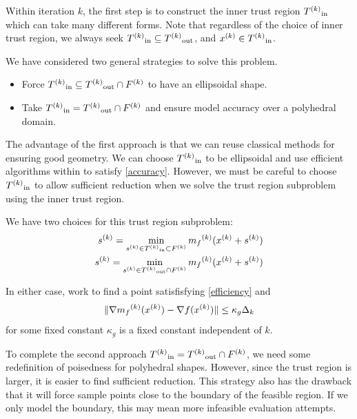 Within iteration $k$, the first step is to construct the inner trust region ${T^{(k)}}_{\text{in}}$ which can take many different forms.
Note that regardless of the choice of inner trust region, we always seek
${T^{(k)}}_{\text{in}} \subseteq {T^{(k)}}_{\text{out}} $, and ${x}^{(k)} \in {T^{(k)}}_{\text{in}}$.


We have considered two general strategies to solve this problem.

\begin{itemize}
\item Force $\label{bluepill} {T^{(k)}}_{\text{in}} \subseteq {T^{(k)}}_{\text{out}} \cap {F}^{(k)}$ to have an ellipsoidal shape.
\item Take $\label{redpill} {T^{(k)}}_{\text{in}} = {T^{(k)}}_{\text{out}} \cap {F}^{(k)}$ and ensure model accuracy over a polyhedral domain.
\end{itemize}

The advantage of the first approach is that we can reuse classical methods for ensuring good geometry.
We can choose ${T^{(k)}}_{\text{in}}$ to be ellipsoidal and use efficient algorithms within \cite{DUMMY:intro_book} to satisfy \ref{accuracy}.
However, we must be careful to choose ${T^{(k)}}_{\text{in}}$ to allow sufficient reduction when we solve the trust region subproblem using the inner trust region.


We have two choices for this trust region subproblem:
\label{which_trust_region}
\begin{align}
{s}^{(k)} = \min_{{s}^{(k)} \in {T^{(k)}}_{\text{in}} \subset {F}^{(k)}} {{m}_f}^{(k)}({x}^{(k)} + {s}^{(k)}) \label{search_a_little} \\
{s}^{(k)} = \min_{{s}^{(k)} \in {T^{(k)}}_{\text{out}} \cap {F}^{(k)}} {{m}_f}^{(k)}({x}^{(k)} + {s}^{(k)}) \label{search_a_lot}
\end{align}

In either case, work to find a point satisfisfying \ref{efficiency} and 
\begin{equation}
\label{accuracy}
\|\nabla {{m}_f}^{(k)}({x}^{(k)}) - \nabla f({x}^{(k)}) \| \le \kappa_g \Delta_k
\end{equation}
 for some fixed constant $\kappa_g$ is a fixed constant independent of $k$.

 

To complete the second approach ${T^{(k)}}_{\text{in}} = {T^{(k)}}_{\text{out}} \cap {F}^{(k)}$, we need some redefinition of poisedness for polyhedral shapes.
However, since the trust region is larger, it is easier to find sufficient reduction.
This strategy also has the drawback that it will force sample points close to the boundary of the feasible region.
If we only model the boundary, this may mean more infeasible evaluation attempts.

